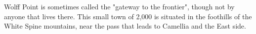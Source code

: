 Wolff Point is sometimes called the "gateway to the frontier", though not by anyone that lives there.
This small town of 2,000 is situated in the foothills of the White Spine mountains, near the pass that leads to Camellia and the East side.
